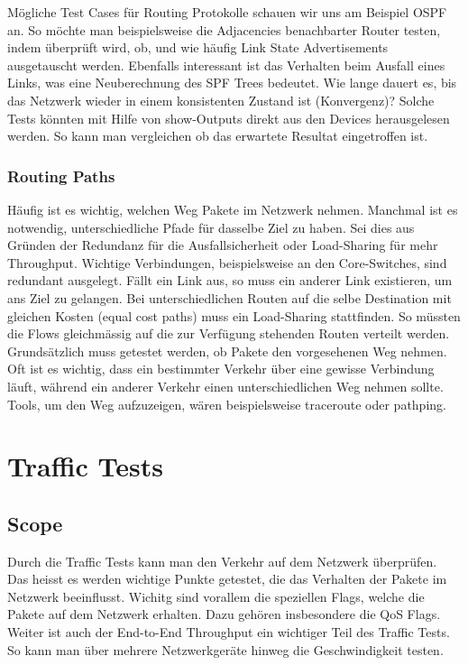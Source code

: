\documentclass[a4,12pt]{scrartcl}
\begin{document}
\noindent Mögliche Test Cases für Routing Protokolle schauen wir uns am Beispiel OSPF an. So möchte man beispielsweise die Adjacencies benachbarter Router testen, indem überprüft wird, ob, und wie häufig Link State Advertisements ausgetauscht werden. Ebenfalls interessant ist das Verhalten beim Ausfall eines Links, was eine Neuberechnung des SPF Trees bedeutet. Wie lange dauert es, bis das Netzwerk wieder in einem konsistenten Zustand ist (Konvergenz)? Solche Tests könnten mit Hilfe von show-Outputs direkt aus den Devices herausgelesen werden. So kann man vergleichen ob das erwartete Resultat eingetroffen ist. 
\subsubsection{Routing Paths}
Häufig ist es wichtig, welchen Weg Pakete im Netzwerk nehmen. Manchmal ist es notwendig, unterschiedliche Pfade für dasselbe Ziel zu haben. Sei dies aus Gründen der Redundanz für die Ausfallsicherheit oder Load-Sharing für mehr Throughput. Wichtige Verbindungen, beispielsweise an den Core-Switches, sind redundant ausgelegt. Fällt ein Link aus, so muss ein anderer Link existieren, um ans Ziel zu gelangen. Bei unterschiedlichen Routen auf die selbe Destination mit gleichen Kosten (equal cost paths) muss ein Load-Sharing stattfinden. So müssten die Flows gleichmässig auf die zur Verfügung stehenden Routen verteilt werden.\\

\noindent Grundsätzlich muss getestet werden, ob Pakete den vorgesehenen Weg nehmen. Oft ist es wichtig, dass ein bestimmter Verkehr über eine gewisse Verbindung läuft, während ein anderer Verkehr einen unterschiedlichen Weg nehmen sollte.\\

\noindent Tools, um den Weg aufzuzeigen, wären beispielsweise traceroute oder pathping.  
\section{Traffic Tests}
\subsection{Scope}
Durch die Traffic Tests kann man den Verkehr auf dem Netzwerk überprüfen. Das heisst es werden wichtige Punkte getestet, die das Verhalten der Pakete im Netzwerk beeinflusst. Wichitg sind vorallem die speziellen Flags, welche die Pakete auf dem Netzwerk erhalten. Dazu gehören insbesondere die QoS Flags.\newline
Weiter ist auch der End-to-End Throughput ein wichtiger Teil des Traffic Tests. So kann man über mehrere Netzwerkgeräte hinweg die Geschwindigkeit testen.
\end{document}

